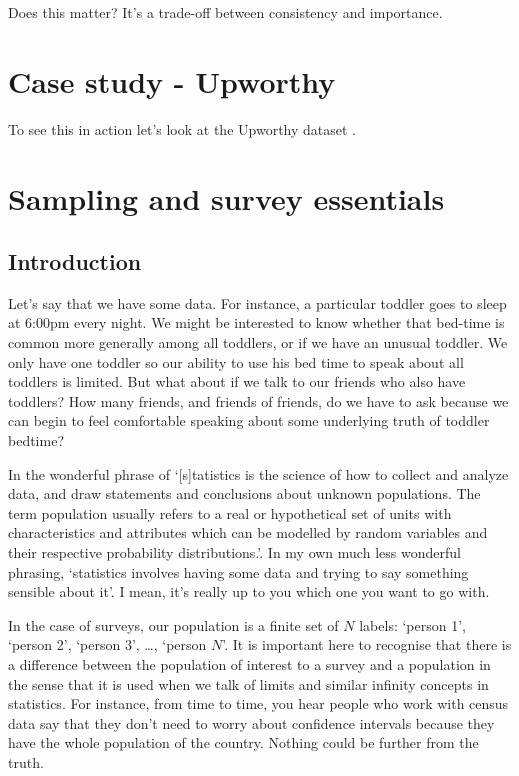 \documentclass[
]{book}
\begin{document}
Does this matter? It's a trade-off between consistency and importance.

\hypertarget{case-study---upworthy}{%
\section{Case study - Upworthy}\label{case-study---upworthy}}

To see this in action let's look at the Upworthy dataset \citet{upworthy}.

\hypertarget{sampling-and-survey-essentials}{%
\section{Sampling and survey essentials}\label{sampling-and-survey-essentials}}

\hypertarget{introduction-16}{%
\subsection{Introduction}\label{introduction-16}}

Let's say that we have some data. For instance, a particular toddler goes to sleep at 6:00pm every night. We might be interested to know whether that bed-time is common more generally among all toddlers, or if we have an unusual toddler. We only have one toddler so our ability to use his bed time to speak about all toddlers is limited. But what about if we talk to our friends who also have toddlers? How many friends, and friends of friends, do we have to ask because we can begin to feel comfortable speaking about some underlying truth of toddler bedtime?

In the wonderful phrase of \citet[p.~3]{wuandthompson} `{[}s{]}tatistics is the science of how to collect and analyze data, and draw statements and conclusions about unknown populations. The term population usually refers to a real or hypothetical set of units with characteristics and attributes which can be modelled by random variables and their respective probability distributions.'. In my own much less wonderful phrasing, `statistics involves having some data and trying to say something sensible about it'. I mean, it's really up to you which one you want to go with.

In the case of surveys, our population is a finite set of \(N\) labels: `person 1', `person 2', `person 3', \ldots, `person \(N\)'. It is important here to recognise that there is a difference between the population of interest to a survey and a population in the sense that it is used when we talk of limits and similar infinity concepts in statistics. For instance, from time to time, you hear people who work with census data say that they don't need to worry about confidence intervals because they have the whole population of the country. Nothing could be further from the truth.
\end{document}
